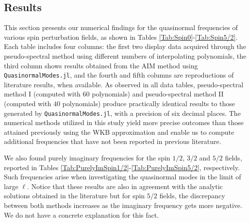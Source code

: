 \subsection{Results}

This section presents our numerical findings for the quasinormal frequencies of various spin perturbation fields, as shown in Tables \ref{Tab:Spin0}-\ref{Tab:Spin5/2}. Each table includes four columns: the first two display data acquired through the pseudo-spectral method using different numbers of interpolating polynomials, the third column shows results obtained from the AIM method using \texttt{QuasinormalModes.jl}, and the fourth and fifth columns are reproductions of literature results, when available. As observed in all data tables, pseudo-spectral method I (computed with $60$ polynomials) and pseudo-spectral method II (computed with $40$ polynomials) produce practically identical results to those generated by \texttt{QuasinormalModes.jl}, with a precision of six decimal places. The numerical methods utilized in this study yield more precise outcomes than those attained previously using the WKB approximation and enable us to compute additional frequencies that have not been reported in previous literature.

We also found purely imaginary frequencies for the spin $1/2$, $3/2$ and $5/2$ fields, reported in Tables \ref{Tab:PurelyImSpin1/2}-\ref{Tab:PurelyImSpin5/2}, respectively. Such frequencies arise when investigating the quasinormal modes in the limit of large $\ell$. Notice that these results are also in agreement with the analytic solutions obtained in the literature but for spin $5/2$ fields, the discrepancy between both methods increases as the imaginary frequency gets more negative. We do not have a concrete explanation for this fact.

